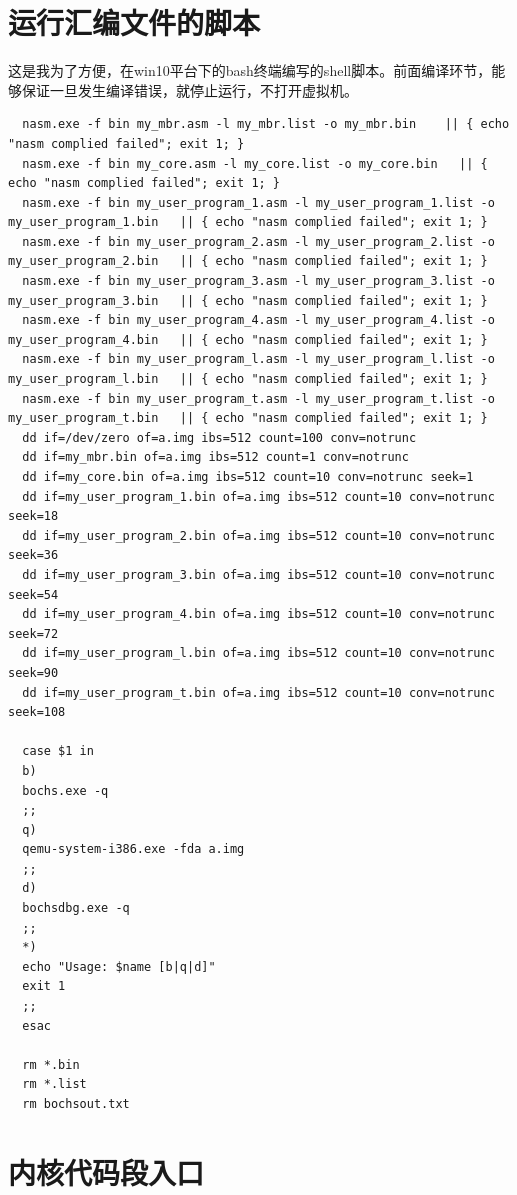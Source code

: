 \documentclass[forprint]{WHUBachelor}
\begin{document}
\chapter{运行汇编文件的脚本}
\label{code:my_shell}
这是我为了方便，在win10平台下的bash终端编写的shell脚本。前面编译环节，能够保证一旦发生编译错误，就停止运行，不打开虚拟机。
\begin{lstlisting}
  nasm.exe -f bin my_mbr.asm -l my_mbr.list -o my_mbr.bin    || { echo "nasm complied failed"; exit 1; }
  nasm.exe -f bin my_core.asm -l my_core.list -o my_core.bin   || { echo "nasm complied failed"; exit 1; }
  nasm.exe -f bin my_user_program_1.asm -l my_user_program_1.list -o my_user_program_1.bin   || { echo "nasm complied failed"; exit 1; }
  nasm.exe -f bin my_user_program_2.asm -l my_user_program_2.list -o my_user_program_2.bin   || { echo "nasm complied failed"; exit 1; }
  nasm.exe -f bin my_user_program_3.asm -l my_user_program_3.list -o my_user_program_3.bin   || { echo "nasm complied failed"; exit 1; }
  nasm.exe -f bin my_user_program_4.asm -l my_user_program_4.list -o my_user_program_4.bin   || { echo "nasm complied failed"; exit 1; }
  nasm.exe -f bin my_user_program_l.asm -l my_user_program_l.list -o my_user_program_l.bin   || { echo "nasm complied failed"; exit 1; }
  nasm.exe -f bin my_user_program_t.asm -l my_user_program_t.list -o my_user_program_t.bin   || { echo "nasm complied failed"; exit 1; }
  dd if=/dev/zero of=a.img ibs=512 count=100 conv=notrunc
  dd if=my_mbr.bin of=a.img ibs=512 count=1 conv=notrunc
  dd if=my_core.bin of=a.img ibs=512 count=10 conv=notrunc seek=1
  dd if=my_user_program_1.bin of=a.img ibs=512 count=10 conv=notrunc seek=18
  dd if=my_user_program_2.bin of=a.img ibs=512 count=10 conv=notrunc seek=36
  dd if=my_user_program_3.bin of=a.img ibs=512 count=10 conv=notrunc seek=54
  dd if=my_user_program_4.bin of=a.img ibs=512 count=10 conv=notrunc seek=72
  dd if=my_user_program_l.bin of=a.img ibs=512 count=10 conv=notrunc seek=90
  dd if=my_user_program_t.bin of=a.img ibs=512 count=10 conv=notrunc seek=108
  
  case $1 in
  b)
  bochs.exe -q
  ;;  
  q)
  qemu-system-i386.exe -fda a.img
  ;;  
  d)
  bochsdbg.exe -q  
  ;;  
  *)
  echo "Usage: $name [b|q|d]"  
  exit 1  
  ;;  
  esac
  
  rm *.bin
  rm *.list
  rm bochsout.txt
\end{lstlisting}

\chapter{内核代码段入口}
\end{document}
